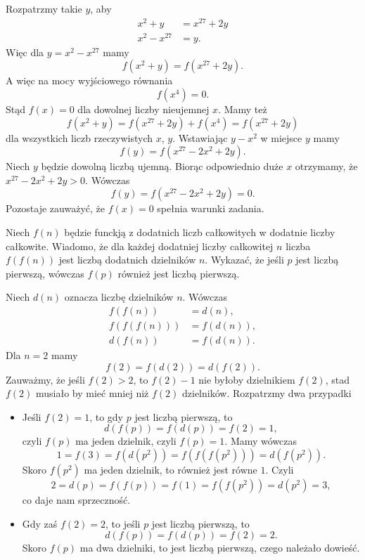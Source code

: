 
\noindent
Rozpatrzmy takie $y$, aby 
\begin{align*}
	x^2 + y &= x^{27} + 2y \\
	x^2 - x^{27} &= y.
\end{align*}
Więc dla $y = x^2 - x^{27}$ mamy
\[
	f(x^2 + y) = f(x^{27} + 2y).
\]
A więc na mocy wyjściowego równania
\[
	f(x^4) = 0.
\]
Stąd $f(x) = 0$ dla dowolnej liczby nieujemnej $x$. Mamy też
\[
	f(x^2 + y) = f(x^{27} + 2y) + f(x^4) =  f(x^{27} + 2y)
\]
dla wszystkich liczb rzeczywistych $x$, $y$. Wstawiając $y - x^2$ w miejsce $y$ mamy
\[
	f(y) = f(x^{27} - 2x^2 + 2y).
\]
Niech $y$ będzie dowolną liczbą ujemną. Biorąc odpowiednio duże $x$ otrzymamy, że $x^{27} - 2x^2 + 2y > 0$. Wówczas
\[
	f(y) = f(x^{27} - 2x^2 + 2y) = 0.
\]
Pozostaje zauważyć, że $f(x) = 0$ spełnia warunki zadania.

\begin{problem}{4}
	Niech $f(n)$ będzie funckją z dodatnich liczb całkowitych w dodatnie liczby całkowite. Wiadomo, że dla każdej dodatniej liczby całkowitej $n$ liczba  $f(f(n))$ jest liczbą dodatnich dzielników $n$. Wykazać, że jeśli $p$ jest liczbą pierwszą, wówczas $f(p)$ również jest liczbą pierwszą.
\end{problem}

\noindent
Niech $d(n)$ oznacza liczbę dzielników $n$. Wówczas
\begin{align*}
	f(f(n)) &= d(n), \\
	f(f(f(n))) &= f(d(n)), \\
	d(f(n)) &= f(d(n)).
\end{align*}
Dla $n = 2$ mamy
\[
	f(2) = f(d(2)) = d(f(2)).
\]
Zauważmy, że jeśli $f(2) > 2$, to $f(2) - 1$ nie byłoby dzielnikiem $f(2)$, stad $f(2)$ musiało by mieć mniej niż $f(2)$ dzielników. Rozpatrzmy dwa przypadki
\begin{itemize}
	\item Jeśli $f(2) = 1$, to gdy $p$ jest liczbą pierwszą, to 
	\[
		d(f(p)) = f(d(p)) = f(2) = 1,
	\]
	czyli $f(p)$ ma jeden dzielnik, czyli $f(p) = 1$. Mamy wówczas
	\[
		1 = f(3) = f(d(p^2)) = f(f(f(p^2))) = d(f(p^2)).
	\]
	Skoro $f(p^2)$ ma jeden dzielnik, to również jest równe $1$. Czyli
	\[
		2 = d(p) = f(f(p)) = f(1) = f(f(p^2)) = d(p^2) = 3,
	\]
	co daje nam sprzeczność.
	\item Gdy zaś $f(2) = 2$, to jeśli $p$ jest liczbą pierwszą, to 
	\[
		d(f(p)) = f(d(p)) = f(2) = 2.
	\]
	Skoro $f(p)$ ma dwa dzielniki, to jest liczbą pierwszą, czego należało dowieść.
\end{itemize}

